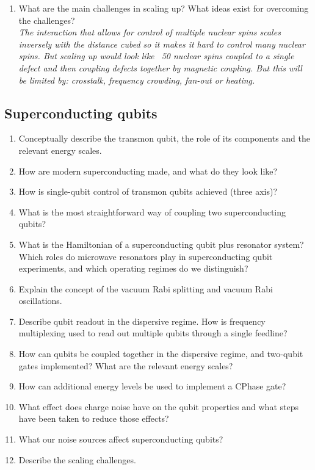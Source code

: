 \documentclass[a4paper]{scrartcl}
\newcommand{\qa}[2]{#1\\ \textit{#2}}
\begin{document}
\begin{enumerate}
  \item \qa{What are the main challenges in scaling up? What ideas exist for overcoming the challenges?}{The interaction that allows for control of multiple nuclear spins scales inversely with the distance cubed so it makes it hard to control many nuclear spins. But scaling up would look like ~50 nuclear spins coupled to a single defect and then coupling defects together by magnetic coupling. But this will be limited by: crosstalk, frequency crowding, fan-out or heating.}
\end{enumerate}

\subsection*{Superconducting qubits}
\begin{enumerate}
  \item \qa{Conceptually describe the transmon qubit, the role of its components and the relevant energy scales.}{}
  \item \qa{How are modern superconducting made, and what do they look like?}{}
  \item \qa{How is single-qubit control of transmon qubits achieved (three axis)?}{}
  \item \qa{What is the most straightforward way of coupling two superconducting qubits?}{}
  \item \qa{What is the Hamiltonian of a superconducting qubit plus resonator system? Which roles do microwave resonators play in superconducting qubit experiments, and which operating regimes do we distinguish?}{}
  \item \qa{Explain the concept of the vacuum Rabi splitting and vacuum Rabi oscillations. }{}
  \item \qa{Describe qubit readout in the dispersive regime. How is frequency multiplexing used to read out multiple qubits through a single feedline?}{}
  \item \qa{How can qubits be coupled together in the dispersive regime, and two-qubit gates implemented? What are the relevant energy scales?  }{}
  \item \qa{How can additional energy levels be used to implement a CPhase gate?  }{}
  \item \qa{What effect does charge noise have on the qubit properties and what steps have been taken to reduce those effects?}{}
  \item \qa{What our noise sources affect superconducting qubits? }{}
  \item \qa{Describe the scaling challenges.}{}
\end{enumerate}
\end{document}
